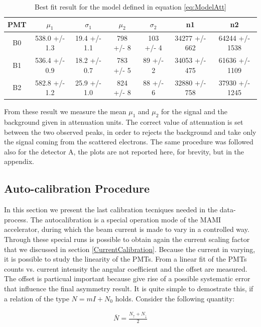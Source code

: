 \begin{table}
\centering
\begin{tabular}{c|c|c|c|c|c|c}
\hline
 PMT   &  $\mu_{1}$         &  $\sigma_{1}$         & $\mu_{2}$          & $\sigma_{2}$   & n1                & n2                 \\
\hline
 B0    & 538.0 +/- 1.3 & 19.4 +/- 1.1 & 798 +/- 8 & 103 +/- 4 & 34277 +/- 662 & 64244 +/- 1538 \\
 B1    & 536.4 +/- 0.9 & 18.2 +/- 0.7 & 783 +/- 5 & 89 +/- 2  & 34053 +/- 475 & 61636 +/- 1109 \\
 B2    & 582.8 +/- 1.2 & 25.9 +/- 1.0 & 824 +/- 8 & 88 +/- 6  & 32880 +/- 758 & 37930 +/- 1245 \\
\hline
\end{tabular}
\caption{Best fit result for the model defined in equation \ref{eq:ModelAtt}}
\end{table}

From these result we measure the mean $\mu_{1}$ and $\mu_{2}$ for the signal and the background given in attenuation units. The correct value of attenuation is set between the two observed peaks, in order to rejects the background and take only the signal coming from the scattered electrons. The same procedure was followed also for the detector A, the plots are not reported here, for brevity, but in the appendix.

\subsection{Auto-calibration Procedure} \label{Autocalib}

In this section we present the last calibration tecniques needed in the data-process. The autocalibration is a special operation mode of the MAMI accelerator, during which the beam current is made to vary in a controlled way. Through these special runs is possible to obtain again the current scaling factor that we discussed in section \ref{CurrentCalibration}. Because the current in varying, it is possible to study the linearity of the PMTs. From a linear fit of the PMTs counts vs. current intensity the angular coefficient and the offset are measured. The offset is particual important because give rise of a possible systematic error that influence the final asymmetry result. It is quite simple to demostrate this, if a relation of the type $N = mI + N_{0} $ holds. Consider the following quantity:

\begin{align*}
\overline{N} = \frac{N_{\uparrow} + N_{\downarrow}}{2}
\end{align*} 

